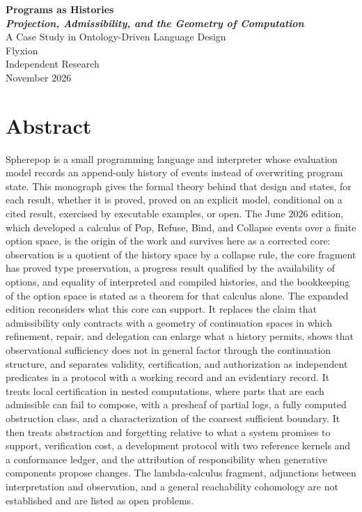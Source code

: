 \documentclass[12pt,oneside,openany]{book}
\theoremstyle{spherepop}
\theoremstyle{remarkstyle}
\begin{document}
\frontmatter

\begin{titlepage}
\vspace*{3cm}
\begin{center}
{\fontsize{26}{32}\selectfont\bfseries Programs as Histories}\\[6pt]
{\fontsize{18}{24}\selectfont\bfseries\itshape Projection, Admissibility, and the Geometry of Computation}\\[12pt]
{\large A Case Study in Ontology-Driven Language Design}\\[48pt]
{\large Flyxion}\\[8pt]
{\normalsize Independent Research}\\[48pt]
{\normalsize November 2026}
\end{center}
\end{titlepage}

\chapter*{Abstract}

Spherepop is a small programming language and interpreter whose evaluation model records an append-only history of events instead of overwriting program state. This monograph gives the formal theory behind that design and states, for each result, whether it is proved, proved on an explicit model, conditional on a cited result, exercised by executable examples, or open. The June 2026 edition, which developed a calculus of Pop, Refuse, Bind, and Collapse events over a finite option space, is the origin of the work and survives here as a corrected core: observation is a quotient of the history space by a collapse rule, the core fragment has proved type preservation, a progress result qualified by the availability of options, and equality of interpreted and compiled histories, and the bookkeeping of the option space is stated as a theorem for that calculus alone. The expanded edition reconsiders what this core can support. It replaces the claim that admissibility only contracts with a geometry of continuation spaces in which refinement, repair, and delegation can enlarge what a history permits, shows that observational sufficiency does not in general factor through the continuation structure, and separates validity, certification, and authorization as independent predicates in a protocol with a working record and an evidentiary record. It treats local certification in nested computations, where parts that are each admissible can fail to compose, with a presheaf of partial logs, a fully computed obstruction class, and a characterization of the coarsest sufficient boundary. It then treats abstraction and forgetting relative to what a system promises to support, verification cost, a development protocol with two reference kernels and a conformance ledger, and the attribution of responsibility when generative components propose changes. The lambda-calculus fragment, adjunctions between interpretation and observation, and a general reachability cohomology are not established and are listed as open problems.
\end{document}
